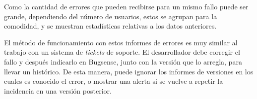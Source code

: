 \documentclass[main]{subfiles}
\begin{document}
Como la cantidad de errores que pueden recibirse para un mismo fallo puede ser grande, dependiendo del número de usuarios, estos se agrupan para la comodidad, y se muestran estadísticas relativas a los datos anteriores.

El método de funcionamiento con estos informes de errores es muy similar al trabajo con un sistema de \emph{tickets} de soporte. El desarrollador debe corregir el fallo y después indicarlo en Bugsense, junto con la versión que lo arregla, para llevar un histórico. De esta manera, puede ignorar los informes de versiones en los cuales es conocido el error, o mostrar una alerta si se vuelve a repetir la incidencia en una versión posterior.
\end{document}
